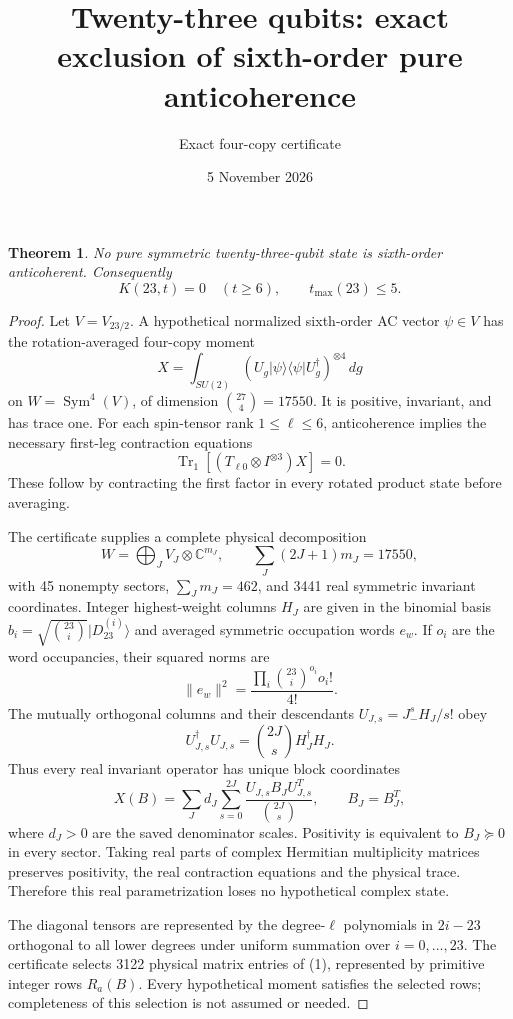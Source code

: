 \documentclass[11pt]{article}
\newtheorem{theorem}{Theorem}
\newcommand{\Tr}{\operatorname{Tr}}
\begin{document}
\title{Twenty-three qubits: exact exclusion of sixth-order pure anticoherence}
\author{Exact four-copy certificate}\date{5 November 2026}\maketitle
\begin{theorem}
No pure symmetric twenty-three-qubit state is sixth-order anticoherent.
Consequently
\[
\boxed{K(23,t)=0\quad(t\ge6),\qquad t_{\max}(23)\le5.}
\]
\end{theorem}
\begin{proof}
Let $V=V_{23/2}$. A hypothetical normalized sixth-order AC vector $\psi\in V$ has the rotation-averaged four-copy moment
\[
X=\int_{SU(2)}(U_g|\psi\rangle\langle\psi|U_g^\dagger)^{\otimes4}\,dg
\]
on $W=\operatorname{Sym}^4(V)$, of dimension $\binom{27}{4}=17550$.
It is positive, invariant, and has trace one. For each spin-tensor rank $1\le\ell\le6$, anticoherence implies the necessary first-leg contraction equations
\[
\Tr_1[(T_{\ell0}\otimes I^{\otimes3})X]=0. \tag{1}
\]
These follow by contracting the first factor in every rotated product state before averaging.

The certificate supplies a complete physical decomposition
\[
W=\bigoplus_J V_J\otimes\mathbb C^{m_J},\qquad
\sum_J(2J+1)m_J=17550,
\]
with 45 nonempty sectors, $\sum_Jm_J=462$, and 3441 real symmetric invariant coordinates. Integer highest-weight columns $H_J$ are given in the binomial basis $b_i=\sqrt{\binom{23}{i}}|D_{23}^{(i)}\rangle$ and averaged symmetric occupation words $e_w$. If $o_i$ are the word occupancies, their squared norms are
\[
\|e_w\|^2=\frac{\prod_i\binom{23}{i}^{o_i}o_i!}{4!}.
\]
The mutually orthogonal columns and their descendants $U_{J,s}=J_-^sH_J/s!$ obey
\[
U_{J,s}^\dagger U_{J,s}=\binom{2J}{s}H_J^\dagger H_J.
\]
Thus every real invariant operator has unique block coordinates
\[
X(B)=\sum_Jd_J\sum_{s=0}^{2J}\frac{U_{J,s}B_JU_{J,s}^T}{\binom{2J}{s}},\qquad B_J=B_J^T,
\]
where $d_J>0$ are the saved denominator scales. Positivity is equivalent to $B_J\succeq0$ in every sector. Taking real parts of complex Hermitian multiplicity matrices preserves positivity, the real contraction equations and the physical trace. Therefore this real parametrization loses no hypothetical complex state.

The diagonal tensors are represented by the degree-$\ell$ polynomials in $2i-23$ orthogonal to all lower degrees under uniform summation over $i=0,\ldots,23$. The certificate selects 3122 physical matrix entries of (1), represented by primitive integer rows $R_a(B)$. Every hypothetical moment satisfies the selected rows; completeness of this selection is not assumed or needed.


\end{proof}
\end{document}
